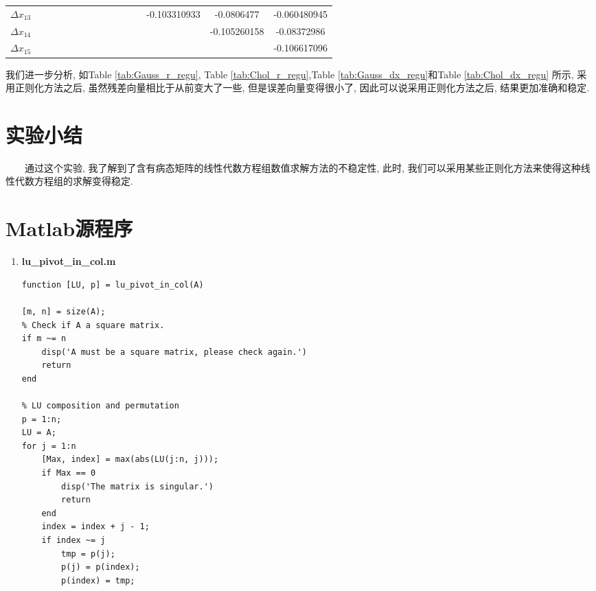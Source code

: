 \documentclass[a4paper]{article}
\begin{document}
\begin{CJK*}{GBK}{song}
\begin{center}
\begin{table*}[t]
{\begin{threeparttable}[t]
\begin{tabular}{ccccc ccccc ccccc}
$\Delta x_{13}$	&		&		&		&		&		&		&		&		&		&		&		&	-0.103310933	&	-0.0806477	&	-0.060480945	\\
$\Delta x_{14}$	&		&		&		&		&		&		&		&		&		&		&		&		&	-0.105260158	&	-0.08372986	\\
$\Delta x_{15}$	&		&		&		&		&		&		&		&		&		&		&		&		&		&	-0.106617096	\\
 \bottomrule
\end{tabular}
\end{threeparttable}}%
\end{table*}
\end{center}

我们进一步分析, 如Table \ref{tab:Gauss_r_regu}, Table \ref{tab:Chol_r_regu},Table \ref{tab:Gauss_dx_regu}和Table \ref{tab:Chol_dx_regu} 所示, 采用正则化方法之后, 虽然残差向量相比于从前变大了一些, 但是误差向量变得很小了, 因此可以说采用正则化方法之后, 结果更加准确和稳定.

\section{实验小结}
~~~~通过这个实验, 我了解到了含有病态矩阵的线性代数方程组数值求解方法的不稳定性, 此时, 我们可以采用某些正则化方法来使得这种线性代数方程组的求解变得稳定.
\section{Matlab源程序}
\begin{enumerate}[(1)]
\item \textbf{lu\_pivot\_in\_col.m} \\
\begin{lstlisting}
function [LU, p] = lu_pivot_in_col(A)

[m, n] = size(A);
% Check if A a square matrix.
if m ~= n
    disp('A must be a square matrix, please check again.')
    return
end

% LU composition and permutation
p = 1:n;
LU = A;
for j = 1:n
    [Max, index] = max(abs(LU(j:n, j)));
    if Max == 0
        disp('The matrix is singular.')
        return
    end
    index = index + j - 1;
    if index ~= j
        tmp = p(j);
        p(j) = p(index);
        p(index) = tmp;


\end{lstlisting}
\end{enumerate}
\end{CJK*}
\end{document}
